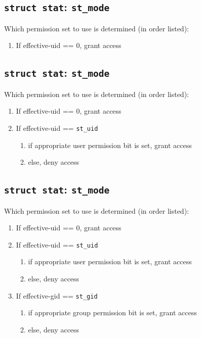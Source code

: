 \documentclass[xga]{xdvislides}
\begin{document}
\subsection{{\tt struct stat}: {\tt st\_mode}}
Which permission set to use is determined (in order listed):
\begin{enumerate}
	\item If effective-uid == 0, grant access
\end{enumerate}

\subsection{{\tt struct stat}: {\tt st\_mode}}
Which permission set to use is determined (in order listed):
\begin{enumerate}
	\item If effective-uid == 0, grant access
	\item If effective-uid == {\tt st\_uid}
		\begin{enumerate}
			\item if appropriate user permission bit is set, grant access
			\item else, deny access
		\end{enumerate}
\end{enumerate}

\subsection{{\tt struct stat}: {\tt st\_mode}}
Which permission set to use is determined (in order listed):
\begin{enumerate}
	\item If effective-uid == 0, grant access
	\item If effective-uid == {\tt st\_uid}
		\begin{enumerate}
			\item if appropriate user permission bit is set, grant access
			\item else, deny access
		\end{enumerate}
	\item If effective-gid == {\tt st\_gid}
		\begin{enumerate}
			\item if appropriate group permission bit is set, grant access
			\item else, deny access
		\end{enumerate}
\end{enumerate}
\end{document}
